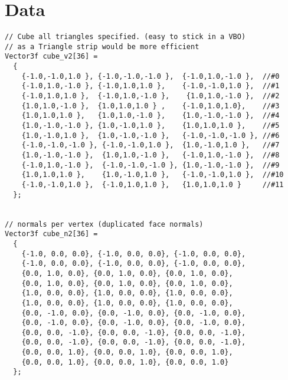 \documentclass[12pt]{article}
\begin{document}
\appendix
\section{Data}

\begin{small}
\begin{verbatim}
// Cube all triangles specified. (easy to stick in a VBO)
// as a Triangle strip would be more efficient 
Vector3f cube_v2[36] =
  {
    {-1.0,-1.0,1.0 }, {-1.0,-1.0,-1.0 },  {-1.0,1.0,-1.0 },  //#0
    {-1.0,1.0,-1.0 }, {-1.0,1.0,1.0 },    {-1.0,-1.0,1.0 },  //#1
    {-1.0,1.0,1.0 },  {-1.0,1.0,-1.0 },    {1.0,1.0,-1.0 },  //#2
    {1.0,1.0,-1.0 },  {1.0,1.0,1.0 } ,    {-1.0,1.0,1.0},    //#3
    {1.0,1.0,1.0 },   {1.0,1.0,-1.0 },    {1.0,-1.0,-1.0 },  //#4
    {1.0,-1.0,-1.0 }, {1.0,-1.0,1.0 },    {1.0,1.0,1.0 },    //#5
    {1.0,-1.0,1.0 },  {1.0,-1.0,-1.0 },   {-1.0,-1.0,-1.0 }, //#6
    {-1.0,-1.0,-1.0 }, {-1.0,-1.0,1.0 },  {1.0,-1.0,1.0 },   //#7 
    {1.0,-1.0,-1.0 },  {1.0,1.0,-1.0 },   {-1.0,1.0,-1.0 },  //#8
    {-1.0,1.0,-1.0 },  {-1.0,-1.0,-1.0 }, {1.0,-1.0,-1.0 },  //#9
    {1.0,1.0,1.0 },    {1.0,-1.0,1.0 },   {-1.0,-1.0,1.0 },  //#10
    {-1.0,-1.0,1.0 },  {-1.0,1.0,1.0 },   {1.0,1.0,1.0 }     //#11
  }; 


// normals per vertex (duplicated face normals) 
Vector3f cube_n2[36] = 
  { 
    {-1.0, 0.0, 0.0}, {-1.0, 0.0, 0.0}, {-1.0, 0.0, 0.0},  
    {-1.0, 0.0, 0.0}, {-1.0, 0.0, 0.0}, {-1.0, 0.0, 0.0},
    {0.0, 1.0, 0.0}, {0.0, 1.0, 0.0}, {0.0, 1.0, 0.0}, 
    {0.0, 1.0, 0.0}, {0.0, 1.0, 0.0}, {0.0, 1.0, 0.0}, 
    {1.0, 0.0, 0.0}, {1.0, 0.0, 0.0}, {1.0, 0.0, 0.0},
    {1.0, 0.0, 0.0}, {1.0, 0.0, 0.0}, {1.0, 0.0, 0.0},  
    {0.0, -1.0, 0.0}, {0.0, -1.0, 0.0}, {0.0, -1.0, 0.0}, 
    {0.0, -1.0, 0.0}, {0.0, -1.0, 0.0}, {0.0, -1.0, 0.0}, 
    {0.0, 0.0, -1.0}, {0.0, 0.0, -1.0}, {0.0, 0.0, -1.0}, 
    {0.0, 0.0, -1.0}, {0.0, 0.0, -1.0}, {0.0, 0.0, -1.0},
    {0.0, 0.0, 1.0}, {0.0, 0.0, 1.0}, {0.0, 0.0, 1.0},
    {0.0, 0.0, 1.0}, {0.0, 0.0, 1.0}, {0.0, 0.0, 1.0} 
  };
\end{verbatim}
\end{small}
\end{document}

